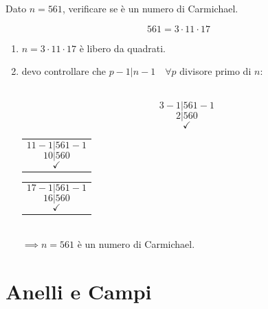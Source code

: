 \documentclass[a4paper,12pt, oneside]{book}
\begin{document}
			\begin{shaded}
				\begin{esempio}
					Dato $n=561$, verificare se è un numero di Carmichael.
					
					$$561=3 \cdot 11 \cdot 17$$
					
					\begin{enumerate}
						\item $n= 3 \cdot 11 \cdot 17$ è libero da quadrati.\\
						\item devo controllare che $p-1|n-1 \quad \forall p $ divisore primo di $n$:\\\\
						\begin{minipage}{0.25\textwidth}
							
							$$3-1 | 561-1$$
							$$2|560$$
							$$\checkmark$$
							
						\end{minipage}%
						\hfill
						\begin{minipage}{0.25\textwidth}
							\begin{tabular}{|p{\textwidth}}
								
								$$11-1 | 561-1$$
								$$10|560$$
								$$\checkmark$$
								
							\end{tabular}
						\end{minipage}%
						\hfill
						\begin{minipage}{0.25\textwidth}
							\begin{tabular}{|p{\textwidth}}
								
								$$17-1 | 561-1$$
								$$16|560$$
								$$\checkmark$$
								
							\end{tabular}
						\end{minipage}\\%
						
						$\implies n = 561$ è un numero di Carmichael.
						
					\end{enumerate}
					
				\end{esempio}
			\end{shaded}
			
			
\chapter{Anelli e Campi}
\end{document}
